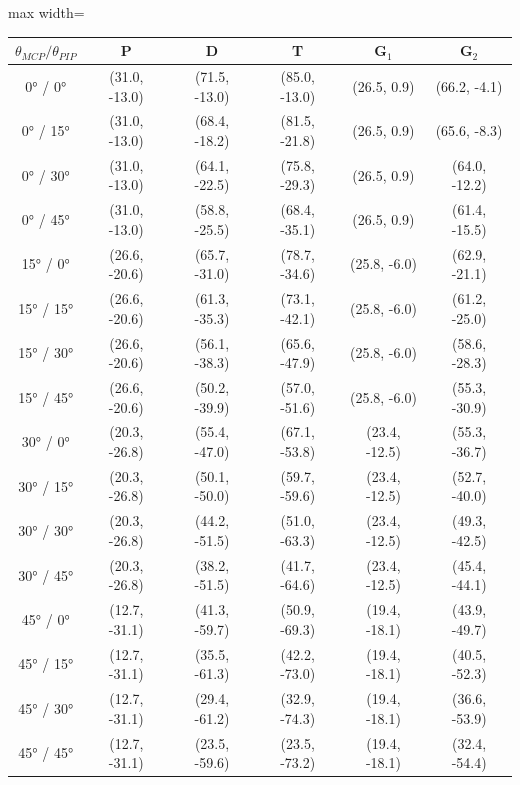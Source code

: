 \begin{table}[H]
\centering
\small
\begin{adjustbox}{max width=\textwidth}
\begin{tabular}{|c|c|c|c|c|c|}
\hline
\textbf{$\theta_{MCP}/\theta_{PIP}$} & \textbf{P} & \textbf{D} & \textbf{T} & \textbf{G$_1$} & \textbf{G$_2$} \\ \hline
0° / 0° & (31.0, -13.0) & (71.5, -13.0) & (85.0, -13.0) & (26.5, 0.9) & (66.2, -4.1) \\ \hline
0° / 15° & (31.0, -13.0) & (68.4, -18.2) & (81.5, -21.8) & (26.5, 0.9) & (65.6, -8.3) \\ \hline
0° / 30° & (31.0, -13.0) & (64.1, -22.5) & (75.8, -29.3) & (26.5, 0.9) & (64.0, -12.2) \\ \hline
0° / 45° & (31.0, -13.0) & (58.8, -25.5) & (68.4, -35.1) & (26.5, 0.9) & (61.4, -15.5) \\ \hline
15° / 0° & (26.6, -20.6) & (65.7, -31.0) & (78.7, -34.6) & (25.8, -6.0) & (62.9, -21.1) \\ \hline
15° / 15° & (26.6, -20.6) & (61.3, -35.3) & (73.1, -42.1) & (25.8, -6.0) & (61.2, -25.0) \\ \hline
15° / 30° & (26.6, -20.6) & (56.1, -38.3) & (65.6, -47.9) & (25.8, -6.0) & (58.6, -28.3) \\ \hline
15° / 45° & (26.6, -20.6) & (50.2, -39.9) & (57.0, -51.6) & (25.8, -6.0) & (55.3, -30.9) \\ \hline
30° / 0° & (20.3, -26.8) & (55.4, -47.0) & (67.1, -53.8) & (23.4, -12.5) & (55.3, -36.7) \\ \hline
30° / 15° & (20.3, -26.8) & (50.1, -50.0) & (59.7, -59.6) & (23.4, -12.5) & (52.7, -40.0) \\ \hline
30° / 30° & (20.3, -26.8) & (44.2, -51.5) & (51.0, -63.3) & (23.4, -12.5) & (49.3, -42.5) \\ \hline
30° / 45° & (20.3, -26.8) & (38.2, -51.5) & (41.7, -64.6) & (23.4, -12.5) & (45.4, -44.1) \\ \hline
45° / 0° & (12.7, -31.1) & (41.3, -59.7) & (50.9, -69.3) & (19.4, -18.1) & (43.9, -49.7) \\ \hline
45° / 15° & (12.7, -31.1) & (35.5, -61.3) & (42.2, -73.0) & (19.4, -18.1) & (40.5, -52.3) \\ \hline
45° / 30° & (12.7, -31.1) & (29.4, -61.2) & (32.9, -74.3) & (19.4, -18.1) & (36.6, -53.9) \\ \hline
45° / 45° & (12.7, -31.1) & (23.5, -59.6) & (23.5, -73.2) & (19.4, -18.1) & (32.4, -54.4) \\ \hline

\end{tabular}
\end{adjustbox}
\end{table}
